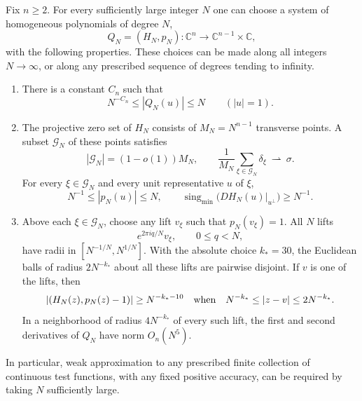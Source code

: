 \begin{lemma}
\label{grid:polynomials}
Fix $n\ge2$.  For every sufficiently large integer $N$ one can choose a
system of homogeneous polynomials of degree $N$,
\[
 Q_N=(H_N,p_N):\mathbb C^n\longrightarrow\mathbb C^{n-1}\times\mathbb C,
\]
with the following properties.  These choices can be made along all
integers $N\to\infty$, or along any prescribed sequence of degrees
tending to infinity.
\begin{enumerate}
\item There is a constant $C_n$ such that
\begin{equation}
 \label{grid:sphere-bounds}
 N^{-C_n}\le |Q_N(u)|\le N\qquad (|u|=1).
\end{equation}
\item The projective zero set of $H_N$ consists of
$M_N=N^{n-1}$ transverse points.  A subset $\mathcal G_N$ of these
points satisfies
\[
 |\mathcal G_N|=(1-o(1))M_N,
 \qquad
 \frac1{M_N}\sum_{\xi\in\mathcal G_N}\delta_\xi
 \ \rightharpoonup\ \sigma.
\]
For every $\xi\in\mathcal G_N$ and every unit representative $u$ of
$\xi$,
\begin{equation}
 \label{grid:goodness}
 N^{-1}\le |p_N(u)|\le N,
 \qquad
 \operatorname{sing}_{\min}
       \bigl(DH_N(u)|_{u^\perp}\bigr)\ge N^{-1}.
\end{equation}
\item Above each $\xi\in\mathcal G_N$, choose any lift $v_\xi$ such
that $p_N(v_\xi)=1$.  All $N$ lifts
\[
 e^{2\pi i q/N}v_\xi,\qquad 0\le q<N,
\]
have radii in $[N^{-1/N},N^{1/N}]$.  With the absolute choice
$k_*=30$, the Euclidean balls of radius $2N^{-k_*}$ about all these
lifts are pairwise disjoint.  If $v$ is one of the lifts, then
\begin{equation}
 \label{grid:shell-bound}
 |(H_N(z),p_N(z)-1)|\ge N^{-k_*-10}
 \quad\hbox{when}\quad
 N^{-k_*}\le |z-v|\le2N^{-k_*}.
\end{equation}
In a neighborhood of radius $4N^{-k_*}$ of every such lift, the first
and second derivatives of $Q_N$ have norm $O_n(N^5)$.
\end{enumerate}
In particular, weak approximation to any prescribed finite collection
of continuous test functions, with any fixed positive accuracy, can be
required by taking $N$ sufficiently large.
\end{lemma}

